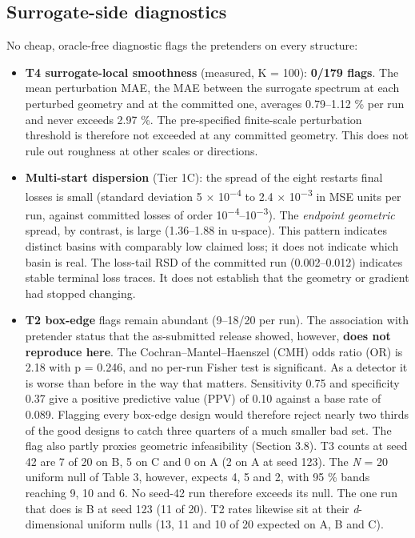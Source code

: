\documentclass[11pt,a4paper]{article}
\providecommand{\tightlist}{\setlength{\itemsep}{0pt}\setlength{\parskip}{0pt}}
\begin{document}
\subsection{Surrogate-side diagnostics}\label{sec:3.7}

No cheap, oracle-free diagnostic flags the pretenders on every structure:

\begin{itemize}
\tightlist
\item
  \textbf{T4 surrogate-local smoothness} (measured, K = 100): \textbf{0/179 flags}. The mean perturbation MAE, the MAE between the surrogate spectrum at each perturbed geometry and at the committed one, averages 0.79--1.12 \% per run and never exceeds 2.97 \%. The
  pre-specified finite-scale perturbation threshold is therefore not exceeded at any
  committed geometry. This does not rule out roughness at other scales or directions.
\item
  \textbf{Multi-start dispersion} (Tier 1C): the spread of the eight restarts\textquotesingle{} final losses
  is small (standard deviation 5 \ensuremath{\times} 10\textsuperscript{\ensuremath{-}}\textsuperscript{4} to 2.4 \ensuremath{\times} 10\textsuperscript{\ensuremath{-}}\textsuperscript{3} in MSE units per run, against
  committed losses of order 10\textsuperscript{\ensuremath{-}}\textsuperscript{4}--10\textsuperscript{\ensuremath{-}}\textsuperscript{3}). The \emph{endpoint geometric} spread, by contrast, is
  large (1.36--1.88 in u-space). This pattern indicates distinct basins with comparably low
  claimed loss; it does not indicate which basin is real. The loss-tail RSD
  of the committed run (0.002--0.012) indicates stable terminal loss traces. It does not
  establish that the geometry or gradient had stopped changing.
\item
  \textbf{T2 box-edge} flags remain abundant (9--18/20 per run). The association with
  pretender status that the as-submitted release showed, however,
  \textbf{does not reproduce here}. The Cochran--Mantel--Haenszel (CMH) odds ratio (OR) is 2.18 with
  p = 0.246, and no per-run Fisher test is significant. As a detector it is worse than
  before in the way that matters. Sensitivity 0.75 and specificity 0.37 give a positive predictive value (PPV) of
  0.10 against a base rate of 0.089. Flagging every box-edge design would therefore
  reject nearly two thirds of the good designs to catch three quarters of a much smaller
  bad set. The flag also partly proxies geometric infeasibility (Section 3.8). T3 counts
  at seed 42 are 7 of 20 on B, 5 on C and 0 on A (2 on A at seed 123). The \emph{N} = 20
  uniform null of Table 3, however, expects 4, 5 and 2, with 95 \% bands reaching 9, 10
  and 6. No seed-42 run therefore exceeds its null. The one run that does is B at seed
  123 (11 of 20). T2 rates likewise sit at their \emph{d}-dimensional uniform nulls (13, 11 and
  10 of 20 expected on A, B and C).
\end{itemize}
\end{document}
